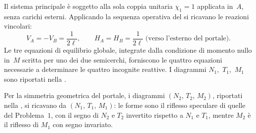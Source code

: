 \begin{esempio}
\begin{svolgimento}


		
		
		
		Il sistema principale è soggetto alla sola coppia
		unitaria $\chi_1 = 1$ applicata in~$A$, senza carichi
		esterni. Applicando la sequenza operativa del
		 si ricavano
		le reazioni vincolari:
		\[
		V_A = -V_B = \frac{1}{2\ell},
		\qquad
		H_A = H_B = \frac{1}{2\ell} \;\text{(verso l'esterno del portale)}.
		\]
		Le tre equazioni di equilibrio globale, integrate
		dalla condizione di momento nullo in~$M$ scritta
		per uno dei due semicerchi, forniscono le quattro
		equazioni necessarie a determinare le quattro
		incognite reattive.
		I diagrammi $N_1$,~$T_1$,~$M_1$ sono riportati
		nella .
		
		



		
		Per la simmetria geometrica del portale, i diagrammi
		$(N_2,\,T_2,\,M_2)$, riportati nella
		, si ricavano da
		$(N_1,\,T_1,\,M_1)$: le forme sono il riflesso speculare
		di quelle del Problema~$1$, con il segno di $N_2$ e $T_2$
		invertito rispetto a $N_1$ e $T_1$, mentre $M_2$ è il
		riflesso di $M_1$ con segno invariato.
		
		



		

\end{svolgimento}
\end{esempio}

